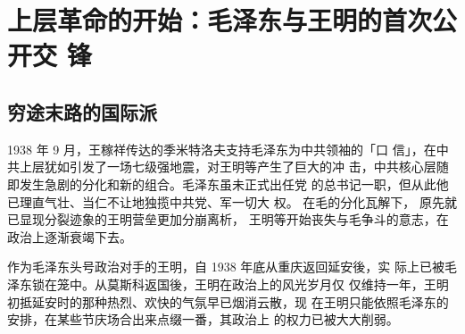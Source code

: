 \chapter{上层革命的开始：毛泽东与王明的首次公开交
锋
}
\section{穷途末路的国际派
}
1938 年 9 月，王稼祥传达的季米特洛夫支持毛泽东为中共领袖的「口
信」，在中共上层犹如引发了一场七级强地震，对王明等产生了巨大的冲
击，中共核心层随即发生急剧的分化和新的组合。毛泽东虽未正式出任党
的总书记一职，但从此他已理直气壮、当仁不让地独揽中共党、军一切大
权。
在毛的分化瓦解下，
原先就已显现分裂迹象的王明营垒更加分崩离析，
王明等开始丧失与毛争斗的意志，在政治上逐渐衰竭下去。

作为毛泽东头号政治对手的王明，自 1938 年底从重庆返回延安後，实
际上已被毛泽东锁在笼中。从莫斯科返国後，王明在政治上的风光岁月仅
仅维持一年，王明初抵延安时的那种热烈、欢快的气氛早已烟消云散，现
在王明只能依照毛泽东的安排，在某些节庆场合出来点缀一番，其政治上
的权力已被大大削弱。

